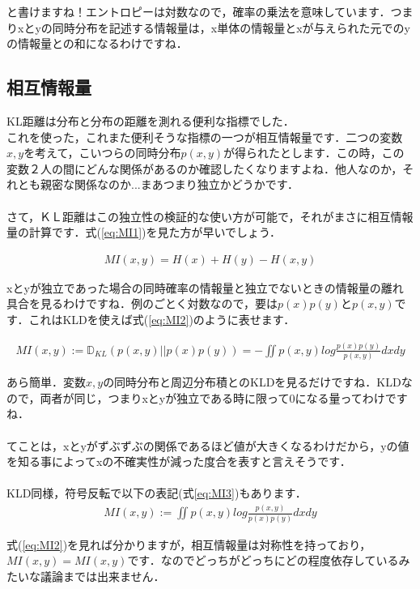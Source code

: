 \documentclass[11pt,a4paper]{jsarticle}                    %
\begin{document}
と書けますね！エントロピーは対数なので，確率の乗法を意味しています．つまりxとyの同時分布を記述する情報量は，x単体の情報量とxが与えられた元でのyの情報量との和になるわけですね．

\subsection{相互情報量}
KL距離は分布と分布の距離を測れる便利な指標でした．\\
これを使った，これまた便利そうな指標の一つが相互情報量です．二つの変数$x, y$を考えて，こいつらの同時分布$p(x,y)$が得られたとします．この時，この変数２人の間にどんな関係があるのか確認したくなりますよね．他人なのか，それとも親密な関係なのか...まあつまり独立かどうかです．\\
\\
さて，ＫＬ距離はこの独立性の検証的な使い方が可能で，それがまさに相互情報量の計算です．式(\ref{eq:MI1})を見た方が早いでしょう\cite{dist}．

\begin{eqnarray}
\label{eq:MI1}
MI(x,y) = H(x) + H(y) - H(x,y)
\end{eqnarray}

xとyが独立であった場合の同時確率の情報量と独立でないときの情報量の離れ具合を見るわけですね．例のごとく対数なので，要は$p(x)p(y)とp(x,y)$です．これはKLDを使えば式(\ref{eq:MI2})のように表せます．

\begin{eqnarray}
\label{eq:MI2}
  MI(x,y) := \mathbb{D}_{KL}(p(x,y) || p(x)p(y)) = -\iint p(x,y) log \frac{p(x)p(y)}{p(x,y)} dxdy
\end{eqnarray}

あら簡単．$変数x,y$の同時分布と周辺分布積とのKLDを見るだけですね．KLDなので，両者が同じ，つまりxとyが独立である時に限って0になる量ってわけですね．\\
\\
てことは，xとyがずぶずぶの関係であるほど値が大きくなるわけだから，yの値を知る事によってxの不確実性が減った度合を表すと言えそうです\cite{prml}．\\
\\
KLD同様，符号反転で以下の表記(式\ref{eq:MI3})もあります．
\begin{eqnarray}
\label{eq:MI3}
  MI(x,y) := \iint p(x,y) log \frac{p(x,y)}{p(x)p(y)} dxdy
\end{eqnarray}

式(\ref{eq:MI2})を見れば分かりますが，相互情報量は対称性を持っており，$MI(x,y) = MI(x,y)$です．なのでどっちがどっちにどの程度依存しているみたいな議論までは出来ません．
\end{document}
